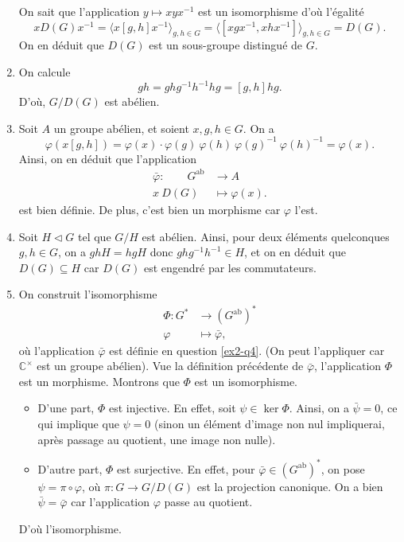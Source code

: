 \documentclass{../../td}
\begin{document}
\begin{enumerate}
      On sait que l'application $y \mapsto x y x^{-1}$ est un isomorphisme d'où l'égalité 
      \[
        x D(G) x^{-1} = \langle x[g,h]x^{-1} \rangle_{g,h \in G} = \langle [x g x^{-1}, x h x^{-1}] \rangle_{g,h \in G} = D(G)
      .\] 
      On en déduit que $D(G)$ est un sous-groupe distingué de $G$.
    \item On calcule 
      \[
        g h = g h g^{-1} h^{-1} h g = [g,h] h g
      .\]
      D'où, $G / D(G)$ est abélien.
    \item Soit $A$ un groupe abélien, et soient $x,g,h \in G$.
      On a \[
        \varphi(x [g,h]) = \varphi(x) \cdot \varphi(g)\: \varphi(h)\: \varphi(g)^{-1}\: \varphi(h)^{-1} = \varphi(x)
      .\]
      Ainsi, on en déduit que l'application 
      \begin{align*}
        \bar\varphi:\quad\quad G^\mathrm{ab} &\longrightarrow A \\
        x\: D(G) &\longmapsto \varphi(x)
      .\end{align*}
      est bien définie. De plus, c'est bien un morphisme car $\varphi$ l'est. \label{ex2-q4}
    \item Soit $H \triangleleft G$ tel que $G / H$ est abélien.
      Ainsi, pour deux éléments quelconques $g,h \in G$, on a $g h H = h g H$ donc $g h g^{-1} h^{-1} \in H$, et on en déduit que $D(G) \subseteq H$ car $D(G)$ est engendré par les commutateurs.
    \item On construit l'isomorphisme 
      \begin{align*}
        \Phi: G^* &\longrightarrow (G^\mathrm{ab})^* \\
        \varphi &\longmapsto \bar\varphi
      ,\end{align*}
      où l'application $\bar{\varphi}$ est définie en question \ref{ex2-q4}. (On peut l'appliquer car $\mathds{C}^\times$ est un groupe abélien).
      Vue la définition précédente de $\bar\varphi$, l'application $\Phi$ est un morphisme.
      Montrons que $\Phi$ est un isomorphisme.
      \begin{itemize}
        \item D'une part, $\Phi$ est injective. En effet, soit $\psi \in \ker \Phi$.
          Ainsi, on a $\bar\psi = 0$, ce qui implique que $\psi = 0$ (sinon un élément d'image non nul impliquerai, après passage au quotient, une image non nulle).
        \item D'autre part, $\Phi$ est surjective.
          En effet, pour $\bar\varphi \in (G^\mathrm{ab})^*$, on pose $\psi = \pi \circ \varphi$, où $\pi : G \to G / D(G)$ est la projection canonique.
          On a bien $\bar\psi = \bar\varphi$ car l'application $\varphi$ passe au quotient.
      \end{itemize}
      D'où l'isomorphisme.
  \end{enumerate}
\end{document}
